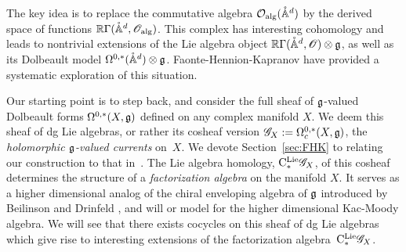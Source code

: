 The key idea is to replace the commutative algebra $\mathcal O_{\rm alg}(\mathring{\mathbb A}^{d})$ by the derived space of functions $\mathbb R \Gamma(\mathring{\mathbb A}^{d}, \mathscr O_{\rm alg})$. 
This complex has interesting cohomology and leads to nontrivial extensions of the Lie algebra object $\mathbb R \Gamma(\mathring{\mathbb A}^{d}, \mathscr O) \otimes \mathfrak g$, as well as its Dolbeault model $\Omega^{0,*}(\mathring{\mathbb A}^d) \otimes \mathfrak g$.
Faonte-Hennion-Kapranov \cite{FHK} have provided a systematic exploration of this situation.

Our starting point is to step back, and consider the full sheaf of $\mathfrak g$-valued Dolbeault forms $\Omega^{0,*}(X, \mathfrak g)$ defined on any complex manifold $X$. 
We deem this sheaf of dg Lie algebras, or rather its cosheaf version $\mathscr G_X := \Omega^{0,*}_c(X, \mathfrak g)$, the {\em holomorphic $\mathfrak g$-valued currents} on~$X$. 
We devote Section~\ref{sec:FHK} to relating our construction to that in~\cite{FHK}.
The Lie algebra homology, ${\rm C}^{\rm Lie}_*\mathscr G_X$, of this cosheaf determines the structure of a {\em factorization algebra} on the manifold $X$.
It serves as a higher dimensional analog of the chiral enveloping algebra of $\mathfrak g$ introduced by Beilinson and Drinfeld \cite{BD}, and will or model for the higher dimensional Kac-Moody algebra. 
We will see that there exists cocycles on this sheaf of dg Lie algebras which give rise to interesting extensions of the factorization algebra~${\rm C}^{\rm Lie}_*\mathscr G_X$.


%

